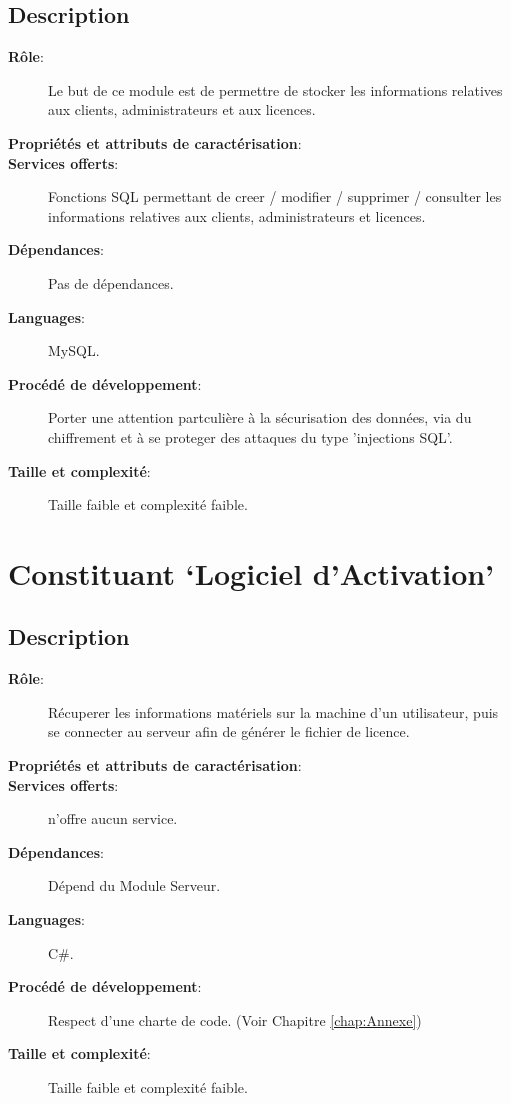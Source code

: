\subsection{Description}
\begin{description}
	\item[\textbf{Rôle}:]
		Le but de ce module est de permettre de stocker les informations relatives aux
		clients, administrateurs et aux licences. 
	\item[\textbf{Propriétés et attributs de caractérisation}:]
	\item[\textbf{Services offerts}:]
		Fonctions SQL permettant de creer / modifier / supprimer / consulter les 
	  informations relatives aux clients, administrateurs et licences.
	\item[\textbf{Dépendances}:]
		Pas de dépendances.		
	\item[\textbf{Languages}:]
		MySQL.
	\item[\textbf{Procédé de développement}:]
	  Porter une attention partculière à la sécurisation des données, via
	  du chiffrement et à se proteger des attaques du type 'injections SQL'. 
	\item[\textbf{Taille et complexité}:]
		Taille faible et complexité faible. 
\end{description}

\section{Constituant `Logiciel d'Activation'}
\subsection{Description}
\begin{description}
	\item[\textbf{Rôle}:]
		Récuperer les informations matériels sur la machine d'un utilisateur, puis 
		se connecter au serveur afin de générer le fichier de licence.
	\item[\textbf{Propriétés et attributs de caractérisation}:]
	\item[\textbf{Services offerts}:] 
		n'offre aucun service.
	\item[\textbf{Dépendances}:]
		Dépend du Module Serveur.
	\item[\textbf{Languages}:]
		C\#.
	\item[\textbf{Procédé de développement}:]
		Respect d'une charte de code. (Voir Chapitre \ref{chap:Annexe})
	\item[\textbf{Taille et complexité}:]
		Taille faible et complexité faible. 
\end{description}

